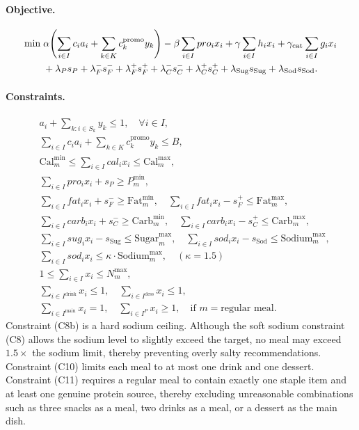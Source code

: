 \documentclass[a4paper]{article}
\begin{document}
\paragraph{Objective.}\leavevmode
\begin{align}
\min\;& \alpha\!\left(\sum_{i\in I} c_i a_i + \sum_{k\in K} c_k^{\text{promo}} y_k\right) - \beta\sum_{i\in I} pro_i x_i + \gamma\sum_{i\in I} h_i x_i + \gamma_{\text{cat}}\sum_{i\in I} g_i x_i \notag\\
& + \lambda_P s_P + \lambda^-_{F} s^-_{F} + \lambda^+_{F} s^+_{F} + \lambda^-_{C} s^-_{C} + \lambda^+_{C} s^+_{C} + \lambda_{\text{Sug}} s_{\text{Sug}} + \lambda_{\text{Sod}} s_{\text{Sod}}. \label{eq:obj}
\end{align}

\paragraph{Constraints.}\leavevmode
\begin{align}
&a_i + \sum_{k:i\in S_k} y_k \le 1, \quad \forall i \in I, \tag{C1: mutual exclusivity}\\
&\sum_{i\in I} c_i a_i + \sum_{k\in K} c_k^{\text{promo}} y_k \le B, \tag{C2: budget}\\
&\text{Cal}^{\min}_m \le \sum_{i\in I} cal_i x_i \le \text{Cal}^{\max}_m, \tag{C3: calorie range, hard}\\
&\sum_{i\in I} pro_i x_i + s_P \ge P^{\min}_m, \tag{C4: protein, soft}\\
&\sum_{i\in I} fat_i x_i + s^-_{F} \ge \text{Fat}^{\min}_m,\quad \sum_{i\in I} fat_i x_i - s^+_{F} \le \text{Fat}^{\max}_m, \tag{C5: fat, soft}\\
&\sum_{i\in I} carb_i x_i + s^-_{C} \ge \text{Carb}^{\min}_m,\quad \sum_{i\in I} carb_i x_i - s^+_{C} \le \text{Carb}^{\max}_m, \tag{C6: carbohydrates, soft}\\
&\sum_{i\in I} sug_i x_i - s_{\text{Sug}} \le \text{Sugar}^{\max}_m, \quad \sum_{i\in I} sod_i x_i - s_{\text{Sod}} \le \text{Sodium}^{\max}_m, \tag{C7--8: sugar/sodium, soft}\\
&\sum_{i\in I} sod_i x_i \le \kappa\cdot \text{Sodium}^{\max}_m, \quad (\kappa = 1.5) \tag{C8b: hard sodium cap}\\
&1 \le \sum_{i\in I} x_i \le N^{\max}_m, \tag{C9: item count}\\
&\sum_{i\in I^{\mathrm{drink}}} x_i \le 1, \quad \sum_{i\in I^{\mathrm{dess}}} x_i \le 1, \tag{C10: meal structure}\\
&\sum_{i\in I^{\mathrm{main}}} x_i = 1, \quad \sum_{i\in I^{P}} x_i \ge 1, \quad \text{if } m = \text{regular meal}. \tag{C11: staple + protein}
\end{align}
Constraint (C8b) is a hard sodium ceiling. Although the soft sodium constraint (C8) allows the sodium level to slightly exceed the target, no meal may exceed $1.5\times$ the sodium limit, thereby preventing overly salty recommendations. Constraint (C10) limits each meal to at most one drink and one dessert. Constraint (C11) requires a regular meal to contain exactly one staple item and at least one genuine protein source, thereby excluding unreasonable combinations such as three snacks as a meal, two drinks as a meal, or a dessert as the main dish.
\end{document}

